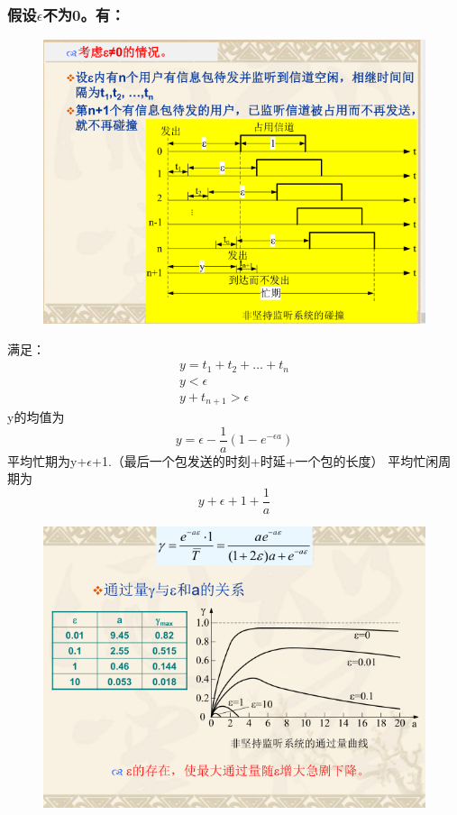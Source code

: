 \subsubsection{假设$ \epsilon $不为0。有：}
\begin{figure}
	\centering
	\includegraphics[width=0.7\linewidth]{figures/screenshot010}
	\caption{}
	\label{fig:screenshot010}
\end{figure}
满足：
\begin{gather}
y = t_1+t_2+\dots+t_n \\
y<\epsilon \\
y+t_{n+1} > \epsilon
\end{gather}
y的均值为
\begin{equation}\label{key}
y = \epsilon - \frac{1}{a}(1-e^{-\epsilon a})
\end{equation}
平均忙期为y+$ \epsilon $+1.（最后一个包发送的时刻+时延+一个包的长度）
平均忙闲周期为
\begin{equation}\label{key}
y+\epsilon +1 + \frac{1}{a}
\end{equation}
\begin{figure}[H]
	\centering
	\includegraphics[width=0.7\linewidth]{figures/screenshot011}
	\caption{}
	\label{fig:screenshot011}
\end{figure}
